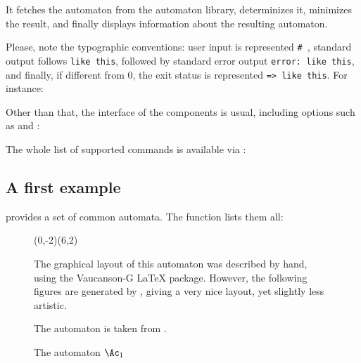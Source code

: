 
\noindent
It fetches the automaton  from the automaton library,
determinizes it, minimizes the result, and finally displays
information about the resulting automaton.

Please, note the typographic conventions: user input is represented
\texttt{\# }, standard output follows \texttt{like
  this}, followed by standard error output \texttt{error: like this},
and finally, if different from 0, the exit status is represented
\texttt{=> like this}.  For instance:


\smallskip

Other than that, the interface of the \tafkit components is usual,
including options such as  and :


The whole list of supported commands is available via
:


\subsection{A first example}

\Vauc provides a set of common automata.  The function
 lists them all:


\begin{figure}[ht] \centering
  \begin{VCPicture}{(0,-2)(6,2)}
  \end{VCPicture}
  \begin{legend}
    The graphical layout of this automaton was described by hand,
    using the Vaucanson-G \LaTeX{} package.  However, the following
    figures are generated by \tafkit, giving a very nice layout, yet
    slightly less artistic.

    The automaton is taken from \citet[Fig. I.1.1, p.
    58]{sakarovitch.03.eta}.
  \end{legend}
  \caption{The automaton $\Ac_1$}
  \label{fig:a1}
\end{figure}

